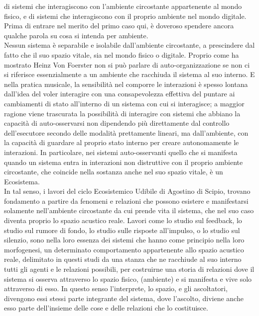 di sistemi che interagiscono con l’ambiente circostante appartenente al mondo fisico, 
e di sistemi che interagiscono con il proprio ambiente nel mondo digitale.
Prima di entrare nel merito del primo caso qui,
è doveroso spendere ancora qualche parola su cosa
si intenda per ambiente. \\
Nessun sistema è separabile e isolabile dall'ambiente circostante, 
a prescindere dal fatto che il suo spazio vitale, sia nel mondo fisico o digitale. 
Proprio come ha mostrato Heinz Von Foerster non si può parlare di auto-organizzazione
se non ci si riferisce essenzialmente a un ambiente che racchiuda il sistema al suo interno.
E nella pratica musicale, la sensibilità nel comporre le interazioni
è spesso lontana dall'idea del voler interagire con una consapevolezza effettiva del 
puntare ai cambiamenti di stato all'interno di un sistema con cui si interagisce;
a maggior ragione viene trascurata la possibilità di interagire con sistemi che abbiano
la capacità di auto-osservarsi non dipendendo più direttamente dal controllo dell'esecutore 
secondo delle modalità prettamente lineari, 
ma dall'ambiente, 
con la capacità di guardare al proprio stato interno per creare autonomamente le interazioni.
In particolare, nei sistemi auto-osservanti quello che si manifesta quando un sistema entra in interazioni non distruttive
con il proprio ambiente circostante, che coincide nella sostanza anche nel suo spazio vitale, è un Ecosistema. \\
In tal senso, i lavori del ciclo Ecosistemico Udibile di Agostino di Scipio, 
trovano fondamento a partire da fenomeni e relazioni che possono esistere e manifestarsi solamente nell'ambiente 
circostante da cui prende vita il sistema, 
che nel suo caso diventa proprio lo spazio acustico reale. 
Lavori come lo studio sul feedback, lo studio sul rumore di fondo, lo studio sulle risposte all'impulso, o
lo studio sul silenzio, sono nella loro essenza dei sistemi che hanno come principio 
nella loro morfogenesi, un determinato 
comportamento appartenente allo spazio acustico reale, delimitato in questi studi da una stanza
che ne racchiude al suo interno tutti gli agenti e le relazioni possibili,
per costruirne una storia di relazioni dove il sistema si osserva attraverso lo spazio fisico, 
(ambiente) e si manifesta e vive solo attraverso di esso.
In questo senso l’interprete, lo spazio, e gli ascoltatori, 
divengono essi stessi parte integrante del sistema, dove l’ascolto, diviene anche esso
parte dell’insieme delle cose e delle relazioni che lo costituisce. \\

